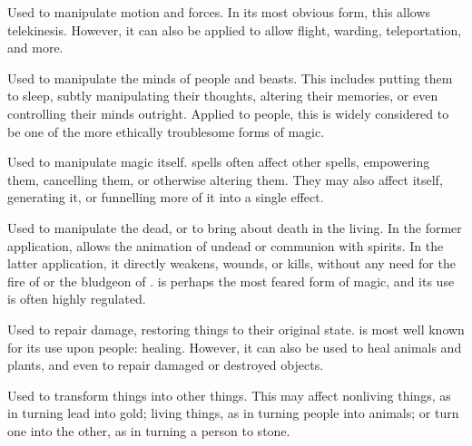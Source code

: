 
Used to manipulate motion and forces.
In its most obvious form, this allows telekinesis.
However, it can also be applied to allow flight, warding, teleportation, and more.


Used to manipulate the minds of people and beasts.
This includes putting them to sleep, subtly manipulating their thoughts, altering their memories, or even controlling their minds outright.
Applied to people, this is widely considered to be one of the more ethically troublesome forms of magic.


Used to manipulate magic itself.
 spells often affect other spells, empowering them, cancelling them, or otherwise altering them.
They may also affect {\mana} itself, generating it, or funnelling more of it into a single effect.


Used to manipulate the dead, or to bring about death in the living.
In the former application,  allows the animation of undead or communion with spirits.
In the latter application, it directly weakens, wounds, or kills, without any need for the fire of  or the bludgeon of .
 is perhaps the most feared form of magic, and its use is often highly regulated.


Used to repair damage, restoring things to their original state.
 is most well known for its use upon people: healing.
However, it can also be used to heal animals and plants, and even to repair damaged or destroyed objects.


Used to transform things into other things.
This may affect nonliving things, as in turning lead into gold; living things, as in turning people into animals; or turn one into the other, as in turning a person to stone.
